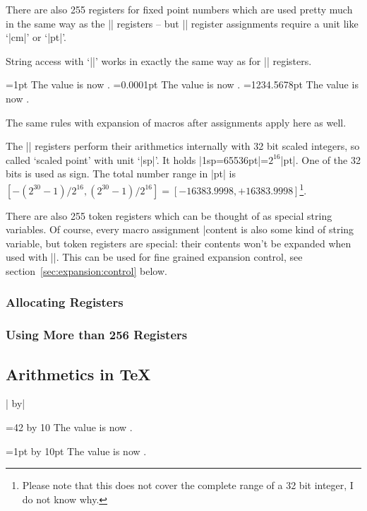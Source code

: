 \begin{command}{\dimen{}}
	There are also 255 registers for fixed point numbers which are used pretty much in the same way as the |\count| registers -- but |\dimen| register assignments require a unit like `|cm|' or `|pt|'.

	String access with `|\the|' works in exactly the same way as for |\count| registers.
\begin{codeexample}[]
=1pt
The value is now \the{}.
=0.0001pt
The value is now \the{}.
\def\macro{1234.5678}
=\macro pt
The value is now \the{}.
\end{codeexample}
	The same rules with expansion of macros after assignments apply here as well.

	The |\dimen| registers perform their arithmetics internally with 32 bit scaled integers, so called `scaled point' with unit `|sp|'. It holds |1sp=65536pt|=$2^{16}$|pt|. One of the 32 bits is used as sign. The total number range in |pt| is $[-(2^{30}-1)/2^{16}, (2^{30}-1)/2^{16} ] = [-16383.9998,+16383.9998]$\footnote{Please note that this does not cover the complete range of a 32 bit integer, I do not know why.}.
\end{command}

\begin{command}{\toks{}}
\label{cmd:toks}
	There are also 255 token registers which can be thought of as special string variables. Of course, every macro assignment |\def\macro|\marg{content} is also some kind of string variable, but token registers are special: their contents won't be expanded when used with |\the\toks|. This can be used for fine grained expansion control, see section~\ref{sec:expansion:control} below.
\end{command}

\subsubsection{Allocating Registers}

\subsubsection{Using More than 256 Registers}

\subsection{Arithmetics in \TeX}
\begin{command}{\advance{}| by|}
\begin{codeexample}[]
=42
\advance{} by 10
The value is now \the{}.
\end{codeexample}

\begin{codeexample}[]
=1pt
\advance{} by 10pt
The value is now \the{}.
\end{codeexample}
\end{command}

